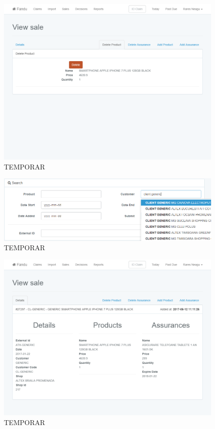 	\begin{figure}
		\includegraphics[width=\linewidth]{../imagini/sales_delete_product.png}
		\caption{TEMPORAR}
		\label{fig:TEMP}
	\end{figure}
	\begin{figure}
		\includegraphics[width=\linewidth]{../imagini/sales_search.png}
		\caption{TEMPORAR}
		\label{fig:TEMP}
	\end{figure}
	\begin{figure}
		\includegraphics[width=\linewidth]{../imagini/sales_view.png}
		\caption{TEMPORAR}
		\label{fig:TEMP}
	\end{figure}
